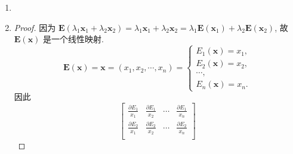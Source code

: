\begin{enumerate}
\begin{enumerate}[(1)]
\begin{proof}
                \end{proof}
            \item %
                \begin{proof}
                    对任意 $\boldsymbol{x} = (x_1, x_2, \cdots, x_n) \in \mathrm{R}^n$, 有
                    \begin{align*}
                        \boldsymbol{f}(\boldsymbol{x}) &= \boldsymbol{f}(x_1, x_2, \cdots, x_n) \\
                        &= \boldsymbol{f}(x_1\boldsymbol{e}_1 + x_2\boldsymbol{e}_2 + \cdots + x_n\boldsymbol{e}_n) \\
                        &= x_1\boldsymbol{f}(\boldsymbol{e}_1) + \boldsymbol{f}(x_2\boldsymbol{e}_2 + \cdots + x_n\boldsymbol{e}_n) \\
                        &= x_1\boldsymbol{f}(\boldsymbol{e}_1) + x_2\boldsymbol{f}(\boldsymbol{e}_2) + \cdots + x_n\boldsymbol{f}(\boldsymbol{e}_n). \qedhere
                    \end{align*}
                \end{proof}
        \end{enumerate}
    \item %
    \item %
        \begin{proof}
            因为 $\boldsymbol{E}(\lambda_1\boldsymbol{x}_1 + \lambda_2\boldsymbol{x}_2) = \lambda_1\boldsymbol{x}_1 + \lambda_2\boldsymbol{x}_2 = \lambda_1\boldsymbol{E}(\boldsymbol{x}_1) + \lambda_2\boldsymbol{E}(\boldsymbol{x}_2)$, 故 $\boldsymbol{E}(\boldsymbol{x})$ 是一个线性映射.
            \[
                \boldsymbol{E}(\boldsymbol{x}) = \boldsymbol{x} = (x_1, x_2, \cdots, x_n) =
                \begin{cases}
                    E_1(\boldsymbol{x}) = x_1, \\
                    E_2(\boldsymbol{x}) = x_2, \\
                    \cdots, \\
                    E_n(\boldsymbol{x}) = x_n.
                \end{cases}    
            \]
            因此
            \[
                \begin{bmatrix}
                    \frac{\partial{E_1}}{x_1} & \frac{\partial{E_1}}{x_2} & \cdots & \frac{\partial{E_1}}{x_n} \\ 
                    \frac{\partial{E_2}}{x_1} & \frac{\partial{E_2}}{x_2} & \cdots & \frac{\partial{E_2}}{x_n} \\

\end{bmatrix}\]
\end{proof}
\end{enumerate}
